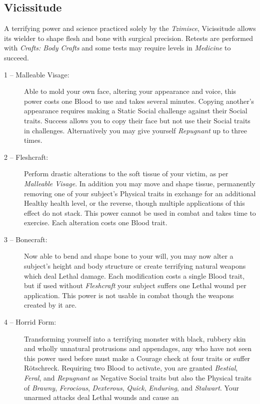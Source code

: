 \subsection{Vicissitude}
A terrifying power and science practiced solely by the \emph{Tzimisce}, Vicissitude allows its wielder 
to shape flesh and bone with surgical precision.  Retests are performed with \emph{Crafts: Body Crafts} 
and some tests may require levels in \emph{Medicine} to succeed.

\begin{description}
	\item[1 -- Malleable Visage:]  Able to mold your own face, altering your appearance and voice, this 
	power costs one Blood to use and takes several minutes.  Copying another's appearance requires making 
	a Static Social challenge against their Social traits.  Success allows you to copy their face but not 
	use their Social traits in challenges.  Alternatively you may give yourself \emph{Repugnant} up to 
	three times.
	\item[2 -- Fleshcraft:]  Perform drastic alterations to the soft tissue of your victim, as per 
	\emph{Malleable Visage}.  In addition you may move and shape tissue, permanently removing one of your 
	subject's Physical traits in exchange for an additional Healthy health level, or the reverse, though 
	multiple applications of this effect do not stack.  This power cannot be used in combat and takes time to 
	exercise.  Each alteration costs one Blood trait.
	\item[3 -- Bonecraft:]  Now able to bend and shape bone to your will, you may now alter a subject's 
	height and body structure or create terrifying natural weapons which deal Lethal damage.  Each 
	modification costs a single Blood trait, but if used without \emph{Fleshcraft} your subject suffers 
	one Lethal wound per application.  This power is not usable in combat though the weapons created 
	by it are.
	\item[4 -- Horrid Form:]  Transforming yourself into a terrifying monster with black, rubbery skin 
	and wholly unnatural protrusions and appendages, any who have not seen this power used before must 
	make a Courage check at four traits or suffer R\"{o}tschreck.  Requiring two Blood to activate, 
	you are granted \emph{Bestial}, \emph{Feral}, and \emph{Repugnant} as Negative Social traits but 
	also the Physical traits of \emph{Brawny}, \emph{Ferocious}, \emph{Dexterous}, \emph{Quick}, 
	\emph{Enduring}, and \emph{Stalwart}.  Your unarmed attacks deal Lethal wounds and cause an

\end{description}

